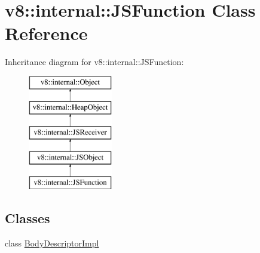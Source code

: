 \hypertarget{classv8_1_1internal_1_1_j_s_function}{}\section{v8\+:\+:internal\+:\+:J\+S\+Function Class Reference}
\label{classv8_1_1internal_1_1_j_s_function}
Inheritance diagram for v8\+:\+:internal\+:\+:J\+S\+Function\+:\begin{figure}[H]
\begin{center}
\leavevmode
\includegraphics[height=5.000000cm]{classv8_1_1internal_1_1_j_s_function}
\end{center}
\end{figure}
\subsection*{Classes}
\begin{DoxyCompactItemize}
\item 
class \hyperlink{classv8_1_1internal_1_1_j_s_function_1_1_body_descriptor_impl}{Body\+Descriptor\+Impl}
\end{DoxyCompactItemize}
